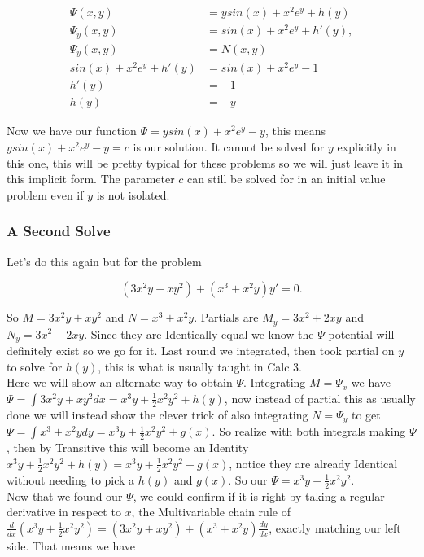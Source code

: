 \documentclass[12pt]{article}
\begin{document}
\begin{align*}
    \Psi(x,y) &= ysin(x)+x^2e^y+h(y) \\
    \Psi_y(x,y) &= sin(x)+x^2e^y+h'(y), \\
    \Psi_y(x,y) &= N(x,y) \\
    sin(x)+x^2e^y+h'(y) &= sin(x)+x^2e^y-1 \\
    h'(y) &= -1 \\
    h(y) &= -y
\end{align*}

Now we have our function $\Psi = ysin(x)+x^2e^y-y$, this means $ysin(x)+x^2e^y-y = c$ is our solution. It cannot be solved for $y$ explicitly in this one, this will be pretty typical for these problems so we will just leave it in this implicit form. The parameter $c$ can still be solved for in an initial value problem even if $y$ is not isolated. \\

\subsubsection{A Second Solve}

Let's do this again but for the problem 

\begin{equation*}
    (3x^2y+xy^2) + (x^3+x^2y)y'=0.
\end{equation*}

So $M=3x^2y+xy^2$ and $N=x^3+x^2y$. Partials are $M_y=3x^2+2xy$ and $N_y=3x^2+2xy$. Since they are Identically equal we know the $\Psi$ potential will definitely exist so we go for it. Last round we integrated, then took partial on $y$ to solve for $h(y)$, this is what is usually taught in Calc 3. \\

Here we will show an alternate way to obtain $\Psi$. Integrating $M=\Psi_x$ we have $\Psi=\int 3x^2y+xy^2 dx=x^3y+\frac{1}{2}x^2y^2+h(y)$, now instead of partial this as usually done we will instead show the clever trick of also integrating $N=\Psi_y$ to get $\Psi=\int x^3+x^2y dy=x^3y+\frac{1}{2}x^2y^2+g(x)$. So realize with both integrals making $\Psi$, then by Transitive this will become an Identity $x^3y+\frac{1}{2}x^2y^2+h(y)=x^3y+\frac{1}{2}x^2y^2+g(x)$, notice they are already Identical without needing to pick a $h(y)$ and $g(x)$. So our $\Psi=x^3y+\frac{1}{2}x^2y^2$. \\

Now that we found our $\Psi$, we could confirm if it is right by taking a regular derivative in respect to $x$, the Multivariable chain rule of $\frac{d}{dx}(x^3y+\frac{1}{2}x^2y^2)=(3x^2y+xy^2) + (x^3+x^2y)\frac{dy}{dx}$, exactly matching our left side. That means we have
\end{document}

